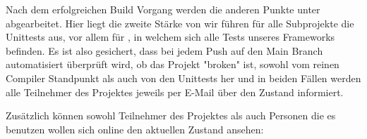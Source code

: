 Nach dem erfolgreichen Build Vorgang werden die anderen Punkte unter  abgearbeitet. Hier liegt die zweite Stärke von  wir führen für alle Subprojekte die Unittests aus, vor allem für , in welchem sich alle Tests unseres Frameworks befinden.
Es ist also gesichert, dass bei jedem Push auf den Main Branch automatisiert überprüft wird, ob das Projekt "broken" ist, sowohl vom reinen Compiler Standpunkt als auch von den Unittests her und in beiden Fällen werden alle Teilnehmer des Projektes jeweils per E-Mail über den Zustand informiert.

Zusätzlich können sowohl Teilnehmer des Projektes als auch Personen die es benutzen wollen sich online den aktuellen Zustand ansehen:

